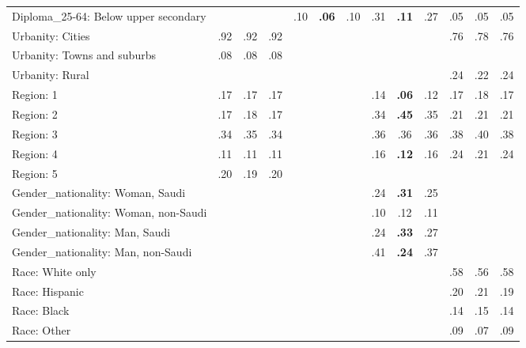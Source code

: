 \begin{tabular}[t]{lcccccccccccc}
Diploma\_25-64: Below upper secondary &  &  &  & .10 & \textbf{.06} & .10 & .31 & \textbf{.11} & .27 & .05 & .05 & .05\\
\addlinespace
Urbanity: Cities & .92 & .92 & .92 &  &  &  &  &  &  & .76 & .78 & .76\\
Urbanity: Towns and suburbs & .08 & .08 & .08 &  &  &  &  &  &  &  &  & \\
Urbanity: Rural &  &  &  &  &  &  &  &  &  & .24 & .22 & .24\\
\addlinespace
Region: 1 & .17 & .17 & .17 &  &  &  & .14 & \textbf{.06} & .12 & .17 & .18 & .17\\
Region: 2 & .17 & .18 & .17 &  &  &  & .34 & \textbf{.45} & .35 & .21 & .21 & .21\\
Region: 3 & .34 & .35 & .34 &  &  &  & .36 & .36 & .36 & .38 & .40 & .38\\
Region: 4 & .11 & .11 & .11 &  &  &  & .16 & \textbf{.12} & .16 & .24 & .21 & .24\\
Region: 5 & .20 & .19 & .20 &  &  &  &  &  &  &  &  & \\
\addlinespace
Gender\_nationality: Woman, Saudi &  &  &  &  &  &  & .24 & \textbf{.31} & .25 &  &  & \\
Gender\_nationality: Woman, non-Saudi &  &  &  &  &  &  & .10 & .12 & .11 &  &  & \\
Gender\_nationality: Man, Saudi &  &  &  &  &  &  & .24 & \textbf{.33} & .27 &  &  & \\
Gender\_nationality: Man, non-Saudi &  &  &  &  &  &  & .41 & \textbf{.24} & .37 &  &  & \\
\addlinespace
Race: White only &  &  &  &  &  &  &  &  &  & .58 & .56 & .58\\
Race: Hispanic &  &  &  &  &  &  &  &  &  & .20 & .21 & .19\\
Race: Black &  &  &  &  &  &  &  &  &  & .14 & .15 & .14\\
Race: Other &  &  &  &  &  &  &  &  &  & .09 & .07 & .09\\
\bottomrule
\end{tabular}